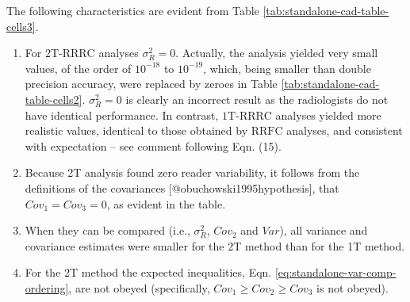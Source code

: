 \documentclass[
]{article}
\providecommand{\tightlist}{%
  \setlength{\itemsep}{0pt}\setlength{\parskip}{0pt}}
\begin{document}
The following characteristics are evident from Table \ref{tab:standalone-cad-table-cells3}.

\begin{enumerate}
\def\labelenumi{\arabic{enumi}.}
\tightlist
\item
  For \(\text{2T-RRRC}\) analyses \(\sigma_R^2 = 0\). Actually, the analysis yielded very small values, of the order of \(10^{-18}\) to \(10^{-19}\), which, being smaller than double precision accuracy, were replaced by zeroes in Table \ref{tab:standalone-cad-table-cells2}. \(\sigma_R^2 = 0\) is clearly an incorrect result as the radiologists do not have identical performance. In contrast, \(\text{1T-RRRC}\) analyses yielded more realistic values, identical to those obtained by \(\text{RRFC}\) analyses, and consistent with expectation -- see comment following Eqn. (15).
\item
  Because 2T analysis found zero reader variability, it follows from the definitions of the covariances {[}@obuchowski1995hypothesis{]}, that \(Cov_1 = Cov_3 = 0\), as evident in the table.
\item
  When they can be compared (i.e., \(\sigma_R^2\), \(Cov_2\) and \(Var\)), all variance and covariance estimates were smaller for the 2T method than for the 1T method.
\item
  For the 2T method the expected inequalities, Eqn. \eqref{eq:standalone-var-comp-ordering}, are not obeyed (specifically, \(Cov_1 \geq Cov_2 \geq Cov_3\) is not obeyed).
\end{enumerate}
\end{document}
